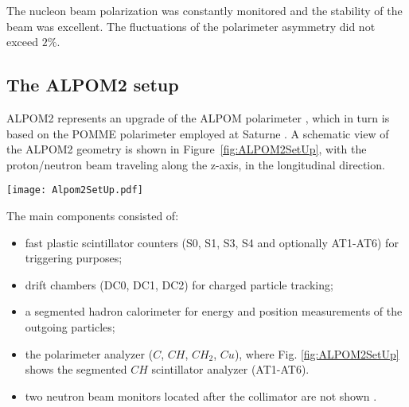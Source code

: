\documentclass[epj]{svjour}
\begin{document}
The nucleon beam polarization was constantly monitored and the stability of the beam was excellent. The  fluctuations of the polarimeter asymmetry did not exceed $2\%$. 
\subsection{The ALPOM2 setup}

ALPOM2 represents an upgrade of the ALPOM polarimeter \cite{Azhgirey:2004yk}, which in turn is based on the POMME polarimeter employed at Saturne  \cite{Bonin:1989tg}.
A schematic view of the ALPOM2 geometry is shown in Figure~\ref{fig:ALPOM2SetUp}, with the proton/neutron beam traveling along the z-axis, in the longitudinal direction. 
\begin{figure*}
\centering
\texttt{[image: Alpom2SetUp.pdf]}
\caption{Side view schematic of the ALPOM2 set up positioned on the secondary proton/neutron beam line, including: scintillation counters (S0, S1, S3, S4); drift chambers (DC0, DC1, DC2); hadron calorimeter. The analyzing targets were located between DC0 and DC1. Here a $CH$ active target (AT1\,-\,AT6), is shown as an example. Dimensions are in mm. $\rm\Theta$ indicates the origin of the $z$ coordinate.}
\label{fig:ALPOM2SetUp}
\end{figure*}
The main components consisted of:
\begin{itemize}
\item fast plastic scintillator counters (S0, S1, S3, S4 and optionally AT1-AT6) for triggering purposes;
\item drift chambers (DC0, DC1, DC2) for charged particle tracking;
\item a segmented hadron calorimeter for energy and position measurements of the outgoing particles;
\item the polarimeter analyzer ($C$, $CH$, $CH_2$, $Cu$), where Fig. \ref{fig:ALPOM2SetUp} shows the segmented $CH$ scintillator analyzer (AT1-AT6). 
\item two neutron beam monitors located after the collimator are not shown \cite{Lehar:1996cr}.
\end{itemize}
\end{document}
